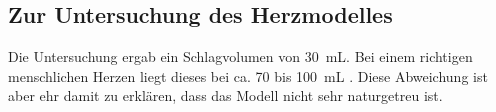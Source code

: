 \subsection{Zur Untersuchung des Herzmodelles}
Die Untersuchung ergab ein Schlagvolumen von \SI{30}{\milli\liter}. Bei einem
richtigen menschlichen Herzen liegt dieses bei ca. 70 bis \SI{100}{\milli\liter}
\cite{wiki}. Diese Abweichung ist aber ehr damit zu erklären, dass das Modell
nicht sehr naturgetreu ist. 
